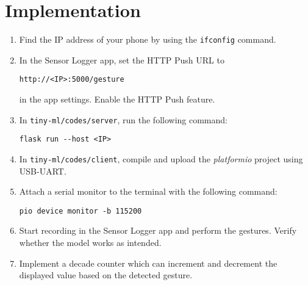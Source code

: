 \section{Implementation}
\begin{enumerate}
    \item Find the IP address of your phone by using the \texttt{ifconfig}
    command.
    \item In the Sensor Logger app, set the HTTP Push URL to
    \begin{lstlisting}
http://<IP>:5000/gesture
    \end{lstlisting}
    in the app settings. Enable the HTTP Push feature.
    \item In \texttt{tiny-ml/codes/server}, run the following command:
    \begin{lstlisting}
flask run --host <IP>
    \end{lstlisting}
    \item In \texttt{tiny-ml/codes/client}, compile and upload the 
    \textit{platformio} project using USB-UART.
    \item Attach a serial monitor to the terminal with the following command:
    \begin{lstlisting}
pio device monitor -b 115200
    \end{lstlisting}
    \item Start recording in the Sensor Logger app and perform the gestures.
    Verify whether the model works as intended.
    \item Implement a decade counter which can increment and decrement the 
    displayed value based on the detected gesture.
\end{enumerate}
